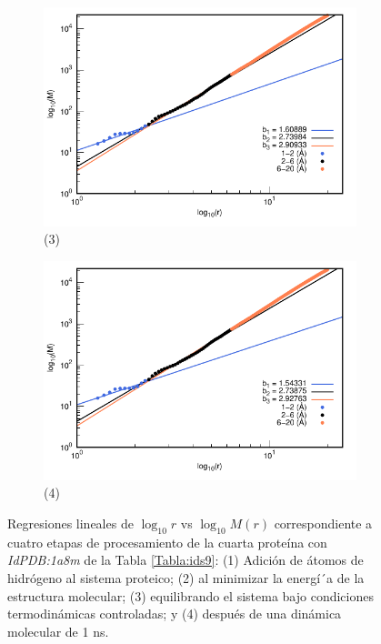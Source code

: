 \begin{figure}[H]
	\vspace{0cm} %
	
	\hspace{-0.3cm} 
	\begin{subfigure}{0.49\textwidth}
		\centering
		\includegraphics[width=\linewidth,page=1]{graphs/PDBs/1a8m/1a8mEq.pdf}
		\caption{(3)}
	\end{subfigure}
	\hspace{0.2cm}
	\begin{subfigure}{0.49\textwidth} %
		\centering
		\includegraphics[width=\linewidth,page=1]{graphs/PDBs/1a8m/1a8m1ns.pdf}
		\caption{(4)}
	\end{subfigure}
	\caption{Regresiones lineales de $\log_{10}r$ vs $\log_{10}M(r)$ correspondiente a cuatro etapas de procesamiento de la cuarta prote\'{i}na con \textit{IdPDB:1a8m} de la Tabla \ref{Tabla:ids9}: (1) Adici\'{o}n de \'{a}tomos de hidr\'{o}geno al sistema proteico; (2) al minimizar la energ\'{i´}a de la estructura molecular; (3) equilibrando el sistema bajo condiciones termodin\'{a}micas controladas; y (4) despu\'{e}s de una din\'{a}mica molecular de 1 ns.}
	\label{fig:1a8m}
\end{figure}


